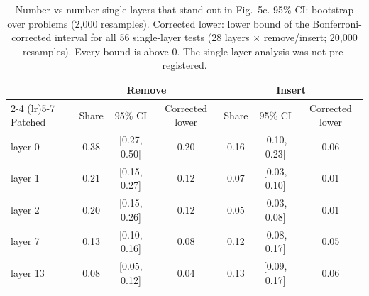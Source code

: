 \begin{table}[t]
\centering
\small
\caption{Number vs number single layers that stand out in Fig.~5c. 95\% CI: bootstrap over problems (2,000 resamples). Corrected lower: lower bound of the Bonferroni-corrected interval for all 56 single-layer tests (28 layers $\times$ remove/insert; 20,000 resamples). Every bound is above 0. The single-layer analysis was not pre-registered.}
\label{tab:fig5-singles}
\begin{tabular}{lcccccc}
\toprule
 & \multicolumn{3}{c}{Remove} & \multicolumn{3}{c}{Insert} \\
\cmidrule(lr){2-4} \cmidrule(lr){5-7}
Patched & Share & 95\% CI & Corrected lower & Share & 95\% CI & Corrected lower \\
\midrule
layer 0 & 0.38 & [0.27, 0.50] & 0.20 & 0.16 & [0.10, 0.23] & 0.06 \\
layer 1 & 0.21 & [0.15, 0.27] & 0.12 & 0.07 & [0.03, 0.10] & 0.01 \\
layer 2 & 0.20 & [0.15, 0.26] & 0.12 & 0.05 & [0.03, 0.08] & 0.01 \\
layer 7 & 0.13 & [0.10, 0.16] & 0.08 & 0.12 & [0.08, 0.17] & 0.05 \\
layer 13 & 0.08 & [0.05, 0.12] & 0.04 & 0.13 & [0.09, 0.17] & 0.06 \\
\bottomrule
\end{tabular}
\end{table}
